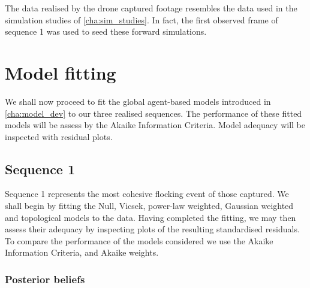 The data realised by the drone captured footage resembles the data used in the
simulation studies of \cref{cha:sim_studies}. In fact, the first observed frame
of sequence 1 was used to seed these forward simulations.
    
\section{Model fitting}

We shall now proceed to fit the global agent-based models introduced in
\cref{cha:model_dev} to our three realised sequences. The performance of these
fitted models will be assess by the Akaike Information Criteria. Model adequacy
will be inspected with residual plots.

\subsection{Sequence 1}

Sequence 1 represents the most cohesive flocking event of those captured. We
shall begin by fitting the Null, Vicsek, power-law weighted, Gaussian weighted
and topological models to the data. Having completed the fitting, we may then
assess their adequacy by inspecting plots of the resulting standardised
residuals. To compare the performance of the models considered we use the
Akaike Information Criteria, and Akaike weights.

\subsubsection{Posterior beliefs}


